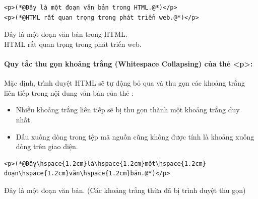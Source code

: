 \begin{codeWindow}
\begin{lstlisting}[language=HTML5]
<p>(*@Đây là một đoạn văn bản trong HTML.@*)</p>
<p>(*@HTML rất quan trọng trong phát triển web.@*)</p>
\end{lstlisting}
\end{codeWindow}
\begin{tcolorbox}[
    enhanced,
    colback=white,
    colframe=primaryBlue!20,
    arc=6pt,
    boxrule=0.8pt,
    drop shadow=black!3!white,
    top=8pt, bottom=8pt, left=12pt, right=12pt,
    title={\sffamily\bfseries\scriptsize\color{codeComment} KẾT QUẢ HIỂN THỊ TRÊN TRÌNH DUYỆT (BROWSER PREVIEW)},
    coltitle=codeComment,
    colbacktitle=codeBg!80!white
]
Đây là một đoạn văn bản trong HTML.\\[4pt]
HTML rất quan trọng trong phát triển web.
\end{tcolorbox}


\paragraph{Quy tắc thu gọn khoảng trắng (Whitespace Collapsing) của thẻ <p>:}
Mặc định, trình duyệt HTML sẽ tự động bỏ qua và thu gọn các khoảng trắng liên tiếp trong nội dung văn bản của thẻ :
\begin{itemize}[leftmargin=1.5em, itemsep=2pt, parsep=0pt]
    \item Nhiều khoảng trắng liên tiếp sẽ bị thu gọn thành một khoảng trắng duy nhất.
    \item Dấu xuống dòng trong tệp mã nguồn cũng không được tính là khoảng xuống dòng trên giao diện.
\end{itemize}

\begin{codeWindow}
\begin{lstlisting}[language=HTML5]
<p>(*@Đây\hspace{1.2cm}là\hspace{1.2cm}một\hspace{1.2cm}đoạn\hspace{1.2cm}văn\hspace{1.2cm}bản.@*)</p>
\end{lstlisting}
\end{codeWindow}

\begin{tcolorbox}[
    enhanced,
    colback=codeBg!30!white,
    colframe=primaryBlue!20,
    arc=6pt,
    boxrule=0.8pt,
    title={\sffamily\bfseries\scriptsize\color{codeComment} KẾT QUẢ HIỂN THỊ TRÊN TRÌNH DUYỆT (BROWSER PREVIEW)},
    coltitle=codeComment,
    colbacktitle=codeBg!80!white
]
Đây là một đoạn văn bản. \hfill \scriptsize\color{codeComment}(Các khoảng trắng thừa đã bị trình duyệt thu gọn)
\end{tcolorbox}


